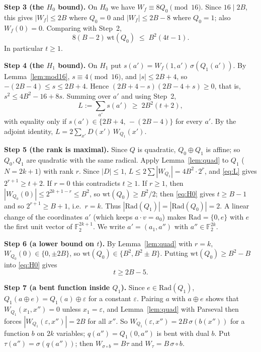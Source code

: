 \documentclass[11pt]{amsart}
\theoremstyle{remark}
\newcommand{\F}{\mathbb{F}_2}
\newcommand{\W}{W}
\newcommand{\sg}{\sigma}
\newcommand{\wt}{\mathrm{wt}}
\newcommand{\Rad}{\mathrm{Rad}}
\begin{document}
\smallskip\noindent\textbf{Step 3 (the $H_0$ bound).}
On $H_0$ we have $\W_f\equiv 8Q_0\pmod{16}$. Since $16\mid 2B$, this gives $|\W_f|\le 2B$ where
$Q_0=0$ and $|\W_f|\le 2B-8$ where $Q_0=1$; also $\W_f(0)=0$. Comparing with Step~2,
\begin{equation}\label{eq:H0}
  8(B-2)\,\wt(Q_0)\;\le\;B^2(4t-1).
\end{equation}
In particular $t\ge1$.

\smallskip\noindent\textbf{Step 4 (the $H_1$ bound).}
On $H_1$ put $s(a')=\W_f(1,a')\,\sg(Q_1(a'))$. By Lemma~\ref{lem:mod16}, $s\equiv 4\pmod{16}$,
and $|s|\le 2B+4$, so $-(2B-4)\le s\le 2B+4$. Hence $(2B+4-s)(2B-4+s)\ge0$, that is,
$s^2\le 4B^2-16+8s$. Summing over $a'$ and using Step~2,
\begin{equation}\label{eq:L}
  L:=\sum_{a'}s(a')\;\ge\;2B^2(t+2),
\end{equation}
with equality only if $s(a')\in\{2B+4,\,-(2B-4)\}$ for every $a'$. By the adjoint identity,
$L=2\sum_{x'}D(x')\,\W_{Q_1}(x')$.

\smallskip\noindent\textbf{Step 5 (the rank is maximal).}
Since $Q$ is quadratic, $Q_0\oplus Q_1$ is affine; so $Q_0,Q_1$ are quadratic with the same
radical. Apply Lemma~\ref{lem:quad} to $Q_1$ ($N=2k+1$) with rank $r$. Since $|D|\le1$,
$L\le 2\sum|\W_{Q_1}|=4B^2\cdot 2^r$, and \eqref{eq:L} gives $2^{r+1}\ge t+2$. If $r=0$
this contradicts $t\ge1$. If $r\ge1$, then $|\W_{Q_0}(0)|\le 2^{2k+1-r}\le B^2$, so
$\wt(Q_0)\ge B^2/2$; then \eqref{eq:H0} gives $t\ge B-1$ and so $2^{r+1}\ge B+1$, i.e.\ $r=k$.
Thus $|\Rad(Q_1)|=|\Rad(Q_0)|=2$. A linear change of the coordinates $a'$ (which keeps
$a\cdot v=a_0$) makes $\Rad=\{0,e\}$ with $e$ the first unit vector of $\F^{2k+1}$. We write
$a'=(a_1,a'')$ with $a''\in\F^{2k}$.

\smallskip\noindent\textbf{Step 6 (a lower bound on $t$).}
By Lemma~\ref{lem:quad} with $r=k$, $\W_{Q_0}(0)\in\{0,\pm2B\}$, so $\wt(Q_0)\in\{B^2,B^2\pm B\}$.
Putting $\wt(Q_0)\ge B^2-B$ into \eqref{eq:H0} gives
\begin{equation}\label{eq:tlow}
  t\ge 2B-5 .
\end{equation}

\smallskip\noindent\textbf{Step 7 (a bent function inside $Q_1$).}
Since $e\in\Rad(Q_1)$, $Q_1(a\oplus e)=Q_1(a)\oplus\varepsilon$ for a constant $\varepsilon$.
Pairing $a$ with $a\oplus e$ shows that $\W_{Q_1}(x_1,x'')=0$ unless $x_1=\varepsilon$, and
Lemma~\ref{lem:quad} with Parseval then forces $|\W_{Q_1}(\varepsilon,x'')|=2B$ for all
$x''$. So $\W_{Q_1}(\varepsilon,x'')=2B\,\sg(b(x''))$ for a function $b$ on $2k$ variables;
$q(a'')=Q_1(0,a'')$ is bent with dual $b$. Put $\tau(a'')=\sg(q(a''))$; then
$\W_{\sg\circ b}=B\tau$ and $\W_\tau=B\,\sg\circ b$.
\end{document}
